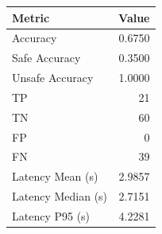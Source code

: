 \begin{table}[ht]
\centering
\begin{tabular}{lr}
\toprule
Metric & Value \\
\midrule
Accuracy & 0.6750 \\
Safe Accuracy & 0.3500 \\
Unsafe Accuracy & 1.0000 \\
TP & 21 \\
TN & 60 \\
FP & 0 \\
FN & 39 \\
Latency Mean (s) & 2.9857 \\
Latency Median (s) & 2.7151 \\
Latency P95 (s) & 4.2281 \\
\bottomrule
\end{tabular}
\end{table}
